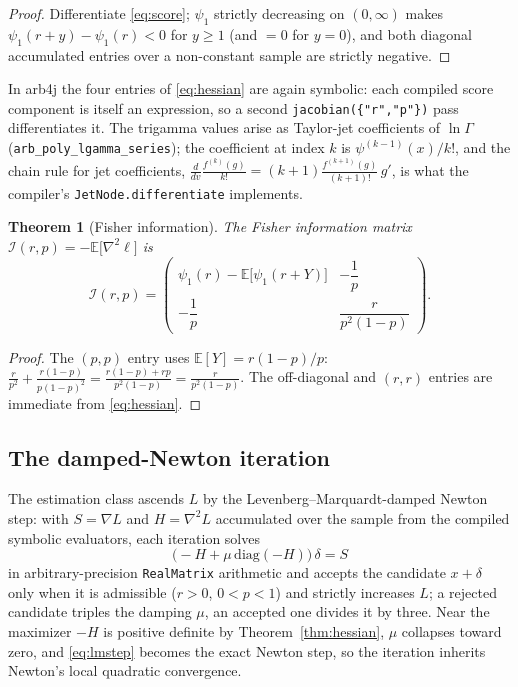 \documentclass[11pt]{article}
\newtheorem{theorem}{Theorem}[section]
\begin{document}
\begin{proof}
Differentiate \eqref{eq:score}; $\psi_{1}$ strictly decreasing on
$(0,\infty)$ makes $\psi_{1}(r+y)-\psi_{1}(r)<0$ for $y\ge1$ (and $=0$ for
$y=0$), and both diagonal accumulated entries over a non-constant sample are
strictly negative.
\end{proof}

In arb4j the four entries of \eqref{eq:hessian} are again symbolic: each
compiled score component is itself an expression, so a second
\texttt{jacobian(\{"r","p"\})} pass differentiates it. The trigamma values
arise as Taylor-jet coefficients of $\ln\Gamma$
(\texttt{arb\_poly\_lgamma\_series}); the coefficient at index $k$ is
$\psi^{(k-1)}(x)/k!$, and the chain rule for jet coefficients,
$\frac{d}{dv}\frac{f^{(k)}(g)}{k!}=(k{+}1)\frac{f^{(k+1)}(g)}{(k{+}1)!}\,g'$,
is what the compiler's \texttt{JetNode.differentiate} implements.

\begin{theorem}[Fisher information]\label{thm:fisher}
The Fisher information matrix
$\mathcal{I}(r,p)=-\mathbb{E}\bigl[\nabla^{2}\ell\bigr]$ is
\begin{equation}
\mathcal{I}(r,p)=
\begin{pmatrix}
\psi_{1}(r)-\mathbb{E}\bigl[\psi_{1}(r+Y)\bigr] & -\dfrac1p\\[1.2ex]
-\dfrac1p & \dfrac{r}{p^{2}(1-p)}
\end{pmatrix}.
\end{equation}
\end{theorem}

\begin{proof}
The $(p,p)$ entry uses $\mathbb{E}[Y]=r(1-p)/p$:
$\frac{r}{p^{2}}+\frac{r(1-p)}{p(1-p)^{2}}
=\frac{r(1-p)+rp}{p^{2}(1-p)}=\frac{r}{p^{2}(1-p)}$. The off-diagonal and
$(r,r)$ entries are immediate from \eqref{eq:hessian}.
\end{proof}

\subsection{The damped-Newton iteration}

The estimation class ascends $L$ by the Levenberg--Marquardt-damped Newton
step: with $S=\nabla L$ and $H=\nabla^{2}L$ accumulated over the sample from
the compiled symbolic evaluators, each iteration solves
\begin{equation}
\bigl(-H+\mu\,\mathrm{diag}(-H)\bigr)\,\delta=S
\label{eq:lmstep}
\end{equation}
in arbitrary-precision \texttt{RealMatrix} arithmetic and accepts the
candidate $x+\delta$ only when it is admissible ($r>0$, $0<p<1$) and
strictly increases $L$; a rejected candidate triples the damping $\mu$, an
accepted one divides it by three. Near the maximizer $-H$ is positive
definite by Theorem~\ref{thm:hessian}, $\mu$ collapses toward zero, and
\eqref{eq:lmstep} becomes the exact Newton step, so the iteration inherits
Newton's local quadratic convergence.
\end{document}
